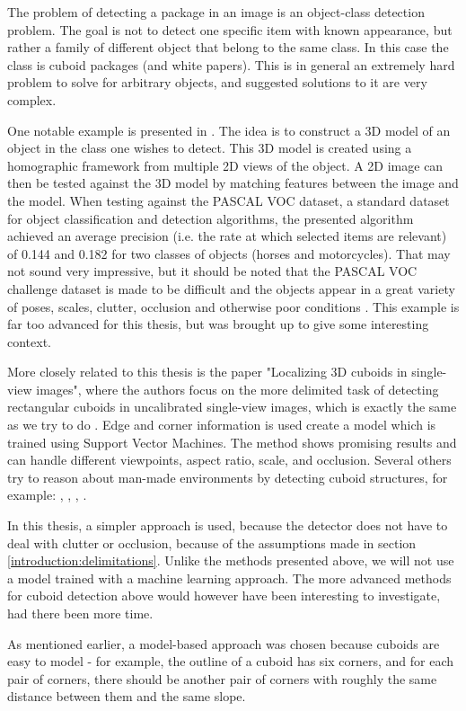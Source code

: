 The problem of detecting a package in an image is an object-class detection problem.
The goal is not to detect one specific item with known appearance, but rather a family of different object that belong to the same class.
In this case the class is cuboid packages (and white papers).
This is in general an extremely hard problem to solve for arbitrary objects, and suggested solutions to it are very complex.

One notable example is presented in \cite{yan20073d}. The idea is to construct a 3D model of an object in the class one wishes to detect.
This 3D model is created using a homographic framework from  multiple 2D views of the object.
A 2D image can then be tested against the 3D model by matching features between the image and the model. 
When testing against the PASCAL VOC dataset, a standard dataset for object classification and detection algorithms, the presented algorithm achieved an average precision (i.e. the rate at which selected items are relevant) of 0.144 and 0.182 for two classes of objects (horses and motorcycles).
That may not sound very impressive, but it should be noted that the PASCAL VOC challenge dataset is made to be difficult and the objects appear in a great variety of poses, scales, clutter, occlusion and otherwise poor conditions \cite{everingham2010pascal}.
This example is far too advanced for this thesis, but was brought up to give some interesting context.

More closely related to this thesis is the paper "Localizing 3D cuboids in single-view images", where the authors focus on the more delimited task of detecting rectangular cuboids in uncalibrated single-view images, which is exactly the same as we try to do \cite{xiaolocalizing}.
Edge and corner information is used create a model which is trained using Support Vector Machines.
The method shows promising results and can handle different viewpoints, aspect ratio, scale, and occlusion.
Several others try to reason about man-made environments by detecting cuboid structures, for example: \cite{hedau2010thinking}, \cite{hedau2012recovering}, \cite{gupta2010estimating}, \cite{del2012bayesian}.

In this thesis, a simpler approach is used, because the detector does not have to deal with clutter or occlusion, because of the assumptions made in section \ref{introduction:delimitations}. Unlike the methods presented above, we will not use a model trained with a machine learning approach. The more advanced methods for cuboid detection above would however have been interesting to investigate, had there been more time.

As mentioned earlier, a model-based approach was chosen because cuboids are easy to model - for example, the outline of a cuboid has six corners, and for each pair of corners, there should be another pair of corners with roughly the same distance between them and the same slope.